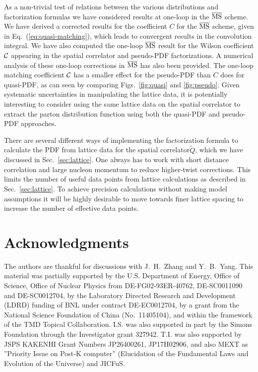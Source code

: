 \documentclass[prd,aps,twocolumn,preprintnumbers,showpacs,nofootinbib,superscriptaddress,notitlepage]{revtex4-1}
\newcommand{\spcorr}{spatial correlator\xspace}
\DeclareRobustCommand{\eq}[1]{Eq.~(\ref{eq:#1})}
\DeclareRobustCommand{\sec}[1]{Sec.~\ref{sec:#1}}
\DeclareRobustCommand{\figs}[2]{Figs.~\ref{fig:#1} and \ref{fig:#2}}
\begin{document}
As a non-trivial test of relations between the various distributions and factorization formulas we have considered results at one-loop in the $\overline{\rm MS}$ scheme. We have derived a corrected results for the coefficient $C$ for the $\overline{\rm MS}$ scheme, given in \eq{quasi-matching}, which leads to convergent results in the convolution integral.   We have also computed the one-loop $\overline{\rm MS}$ result for the Wilson coefficient ${\cal C}$ appearing in the \spcorr and pseudo-PDF factorizations. A numerical analysis of these one-loop corrections in $\overline{\rm MS}$ has also been provided. The one-loop matching coefficient ${\cal C}$ has a smaller effect for the pseudo-PDF than $C$ does for quasi-PDF, as can seen by comparing \figs{quasi}{pseudo}. Given systematic uncertainties in manipulating the lattice data, it is potentially interesting to consider using the same lattice data on the \spcorr to extract the parton distribution function using both the quasi-PDF and pseudo-PDF approaches.

There are several different ways of implementing the factorization formula to calculate the PDF from lattice data for the \spcorr $\tilde Q$, which we have discussed in \sec{lattice}. One always has to work with short distance correlation and large nucleon momentum to reduce higher-twist corrections. This limits the number of useful data points from lattice calculations as described in \sec{lattice}.  To achieve precision calculations without making model assumptions it will be highly desirable to move towards finer lattice spacing to increase the number of effective data points.





\section*{Acknowledgments}
The authors are thankful for discussions with J.~H.~Zhang and Y.~B.~Yang. This material was partially supported by the U.S. Department of Energy, Office of Science, Office of Nuclear Physics from DE-FG02-93ER-40762, DE-SC0011090 and DE-SC0012704, by the Laboratory Directed Research and Development (LDRD) funding of BNL under contract DE-EC0012704, by a grant from the National Science Foundation of China (No.~11405104), and within the framework of the TMD Topical Collaboration.
%
I.S. was also supported in part by the Simons Foundation through the Investigator grant 327942.
T.I. was also supported by JSPS KAKENHI Grant Numbers JP26400261, JP17H02906, and also MEXT as ”Priority Issue on Post-K computer” (Elucidation of the Fundamental Laws and Evolution of the Universe) and JICFuS.
\end{document}
